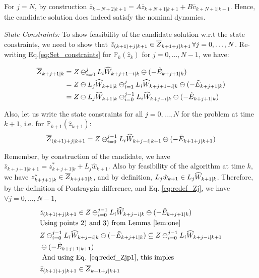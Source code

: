 For $j=N$, by construction $\bar{z}_{k+N+2|k+1} = A\bar{z}_{k+N+1|k+1} + B\bar{v}_{k+N+1|k+1}$. Hence, the candidate solution does indeed satisfy the nominal dynamics.

\textit{State Constraints:} To show feasibility of the candidate solution w.r.t the state constraints, we need to show that $\bar{z}_{(k+1)+j|k+1}\in \overline{Z}_{k+1+j|k+1}\, \forall j=0,\dotsc,N$. Re-writing Eq.\ref{eq:Set_constraints} for $\mathbb{P}_{k}(\hat{z}_k)$ for $j=0,\dotsc,N-1$, we have:

\begin{subequations}
\label{eq:redef_Zj}
\begin{align}
\overline{Z}_{k+j+1|k} &= Z \ominus_{i=0}^{j}L_i\widehat{W}_{k+j+1-i|k} \ominus (-\tilde{E}_{k+j+1|k}) \\
 &= Z \ominus L_j \widehat{W}_{k+1|k} \ominus_{i=1}^{j}L_i\widehat{W}_{k+j+1-i|k} \ominus (-\tilde{E}_{k+j+1|k})\\
 &= Z \ominus L_j \widehat{W}_{k+1|k} \ominus_{i=0}^{j-1}L_i\widehat{W}_{k+j-i|k} \ominus (-\tilde{E}_{k+j+1|k})
\end{align}
\end{subequations}


Also, let us write the state constraints for all $j=0,\dotsc,N$ for the problem at time $k+1$, i.e. for $\mathbb{P}_{k+1}(\hat{z}_{k+1})$:
\begin{equation}
\label{eq:redef_Zjp1}
\overline{Z}_{(k+1)+j|k+1} = Z \ominus_{i=0}^{j-1}L_i\widehat{W}_{k+j-i|k+1} \ominus (-\tilde{E}_{k+1+j|k+1}) \\
\end{equation}

Remember, by construction of the candidate, we have $\bar{z}_{k+j+1|k+1} = z^{*}_{k+j+1|k} + L_j\hat{w}_{k+1}$.
Also by feasibility of the algorithm at time $k$, we have $z^{*}_{k+j+1|k}\in \overline{Z}_{k+j+1|k}$, and by definition, $L_j\hat{w}_{k+1} \in L_j\widehat{W}_{k+1|k}$. Therefore, by the definition of Pontraygin difference, and Eq. \ref{eq:redef_Zj}, we have $\forall j=0,\dotsc,N-1$,
\begin{subequations}
\begin{align}
&\bar{z}_{(k+1)+j|k+1} \in Z \ominus_{i=0}^{j-1}L_i\widehat{W}_{k+j-i|k} \ominus (-\tilde{E}_{k+j+1|k}) \\
&\text{Using points 2) and 3) from Lemma \ref{lem:one} } \nonumber \\ 
&Z \ominus_{i=0}^{j-1}L_i\widehat{W}_{k+j-i|k} \ominus (-\tilde{E}_{k+j+1|k}) \subseteq Z \ominus_{i=0}^{j-1}L_i\widehat{W}_{k+j-i|k+1}  \nonumber \\
& \ominus (-\tilde{E}_{k+j+1|k+1}) \\
&\text{ And using Eq. \ref{eq:redef_Zjp1}, this imples } \nonumber \\
&\bar{z}_{(k+1)+j|k+1} \in \overline{Z}_{k+1+j|k+1}
\end{align} 
\end{subequations}


